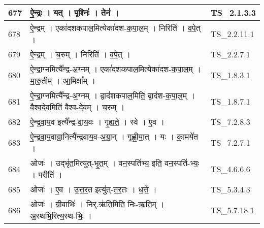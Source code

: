 \documentclass[17pt]{extarticle}
\begin{document}
\begin{longtable}{||p{0.4in}||p{4.9in}||p{0.9in}||}
    \hline
        
    677 & ऐ॒न्द्रः   ।   यत्   ।   पृश्निः॑   ।   तेन॑   ।    & TS\_2.1.3.3       \\
    
    \hline
        
    678 & ऐ॒न्द्रम्   ।   एका॑दशकपाल॒मित्येका॑दश{-}क॒पा॒ल॒म्   ।   निरिति॑   ।   व॒पे॒त्   ।    & TS\_2.2.11.1       \\
    
    \hline
        
    679 & ऐ॒न्द्रम्   ।   च॒रुम्   ।   निरिति॑   ।   व॒पे॒त्   ।    & TS\_2.2.7.1       \\
    
    \hline
        
    680 & ऐ॒न्द्रा॒ग्नमित्यै᳚न्द्र{-}अ॒ग्नम्   ।   एका॑दशकपाल॒मित्येका॑दश{-}क॒पा॒ल॒म्   ।   मा॒रु॒तीम्   ।   आ॒मिक्षा᳚म्   ।    & TS\_1.8.3.1       \\
    
    \hline
        
    681 & ऐ॒न्द्रा॒ग्नमित्यै᳚न्द्र{-}अ॒ग्नम्   ।   द्वाद॑शकपाल॒मिति॒ द्वाद॑श{-}क॒पा॒ल॒म्   ।   वै॒श्व॒दे॒वमिति॑ वैश्व{-}दे॒वम्   ।   च॒रुम्   ।    & TS\_1.8.7.1       \\
    
    \hline
        
    682 & ऐ॒न्द्र॒वा॒य॒व इत्यै᳚न्द्र{-}वा॒य॒वः   ।   गृ॒ह्य॒ते॒   ।   स्वे   ।   ए॒व   ।    & TS\_7.2.8.3       \\
    
    \hline
        
    683 & ऐ॒न्द्र॒वा॒य॒वाग्रा॒नित्यै᳚न्द्रवाय॒व{-}अ॒ग्रा॒न्   ।   गृ॒ह्णी॒या॒त्   ।   यः   ।   का॒मये॑त   ।    & TS\_7.2.7.1       \\
    
    \hline
        
    684 & ओजः॑   ।   उद्भृ॑त॒मित्युत्{-}भृ॒त॒म्   ।   वन॒स्पति॑भ्य॒ इति॒ वन॒स्पति॑{-}भ्यः॒   ।   परीति॑   ।    & TS\_4.6.6.6       \\
    
    \hline
        
    685 & ओजः॑   ।   ए॒व   ।   उ॒त्त॒र॒त इत्यु॑त्{-}त॒र॒तः   ।   ध॒त्ते॒   ।    & TS\_5.3.4.3       \\
    
    \hline
        
    686 & ओजः॑   ।   ग्री॒वाभिः॑   ।   निर्.ऋ॑ति॒मिति॒ निः{-}ऋ॒ति॒म्   ।   अ॒स्थभि॒रित्य॒स्थ{-}भिः॒   ।    & TS\_5.7.18.1       \\
    

\end{longtable}
\end{document}
